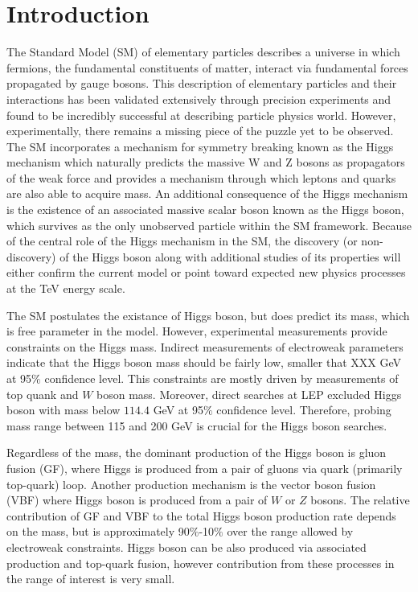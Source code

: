 \documentclass{cmspaper}
\begin{document}

\section{Introduction}
 The Standard Model (SM) of elementary particles describes a universe in which fermions, the fundamental constituents of 
matter, interact via fundamental forces propagated by gauge bosons. This description of elementary particles and their 
interactions has been validated extensively through precision experiments and found to be incredibly successful at 
describing particle physics world. However, experimentally, there remains a missing piece of the puzzle yet to be observed. 
The SM incorporates a mechanism for symmetry breaking known as the Higgs mechanism which naturally predicts the massive 
W and Z bosons as propagators of the weak force and provides a mechanism through which leptons and quarks are also 
able to acquire mass. An additional consequence of the Higgs mechanism is the existence of an associated massive scalar 
boson known as the Higgs boson, which survives as the only unobserved particle within the SM framework. 
Because of the central role of the Higgs mechanism in the SM, the discovery (or non-discovery) of the Higgs boson 
along with additional studies of its properties will either confirm the current model or point toward expected new physics 
processes at the TeV energy scale.

The SM postulates the existance of Higgs boson, but does predict its mass, which is free parameter in the model. However, experimental
measurements provide constraints on the Higgs mass. Indirect measurements of electroweak parameters indicate that the Higgs boson mass 
should be fairly low, smaller that XXX GeV at 95$\%$ confidence level. This constraints are mostly driven by measurements of 
top quank and $W$ boson mass. Moreover, direct searches at LEP excluded Higgs boson with mass below $114.4$ GeV at 95$\%$ confidence 
level. Therefore, probing mass range between 115 and 200 GeV is crucial for the Higgs boson searches.

Regardless of the mass, the dominant production of the Higgs boson is gluon fusion (GF), where Higgs is produced from a pair of 
gluons via quark (primarily top-quark) loop. Another production mechanism is the vector boson fusion (VBF) where Higgs boson
is produced from a pair of $W$ or $Z$ bosons. The relative contribution of GF and VBF to the total Higgs boson production rate
depends on the mass, but is approximately 90$\%$-10$\%$ over the range allowed by electroweak constraints. Higgs boson can be also 
produced via associated production and top-quark fusion, however contribution from these processes in the range of interest is very small.
\end{document}
